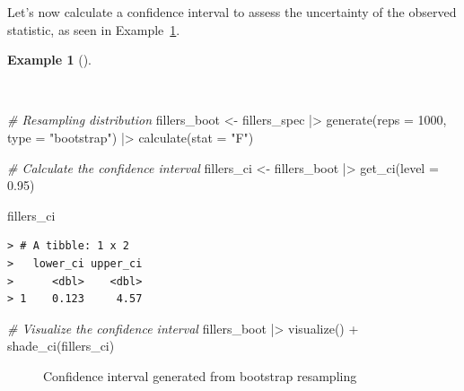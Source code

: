\documentclass[
  letterpaper,
  DIV=11,
  numbers=noendperiod]{scrreprt}
\newenvironment{Shaded}{\begin{snugshade}}{\end{snugshade}}
\newcommand{\AttributeTok}[1]{\textcolor[rgb]{0.00,0.00,0.00}{#1}}
\newcommand{\CommentTok}[1]{\textcolor[rgb]{0.00,0.00,0.00}{\textit{#1}}}
\newcommand{\DecValTok}[1]{\textcolor[rgb]{0.00,0.00,0.00}{#1}}
\newcommand{\FloatTok}[1]{\textcolor[rgb]{0.00,0.00,0.00}{#1}}
\newcommand{\FunctionTok}[1]{\textcolor[rgb]{0.00,0.00,0.00}{#1}}
\newcommand{\NormalTok}[1]{\textcolor[rgb]{0.00,0.00,0.00}{#1}}
\newcommand{\OtherTok}[1]{\textcolor[rgb]{0.00,0.00,0.00}{#1}}
\newcommand{\SpecialCharTok}[1]{\textcolor[rgb]{0.00,0.00,0.00}{#1}}
\newcommand{\StringTok}[1]{\textcolor[rgb]{0.00,0.00,0.00}{#1}}
\theoremstyle{definition}
\newtheorem{example}{Example}[chapter]
\theoremstyle{remark}
\begin{document}
Let's now calculate a confidence interval to assess the uncertainty of
the observed statistic, as seen in Example~\ref{exm-ida-num-bi-edu-ci}.

\begin{example}[]\protect\hypertarget{exm-ida-num-bi-edu-ci}{}\label{exm-ida-num-bi-edu-ci}

~

\begin{Shaded}
\begin{Highlighting}[]
\CommentTok{\# Resampling distribution}
\NormalTok{fillers\_boot }\OtherTok{\textless{}{-}}
\NormalTok{  fillers\_spec }\SpecialCharTok{|\textgreater{}}
  \FunctionTok{generate}\NormalTok{(}\AttributeTok{reps =} \DecValTok{1000}\NormalTok{, }\AttributeTok{type =} \StringTok{"bootstrap"}\NormalTok{) }\SpecialCharTok{|\textgreater{}}
  \FunctionTok{calculate}\NormalTok{(}\AttributeTok{stat =} \StringTok{"F"}\NormalTok{)}

\CommentTok{\# Calculate the confidence interval}
\NormalTok{fillers\_ci }\OtherTok{\textless{}{-}}
\NormalTok{  fillers\_boot }\SpecialCharTok{|\textgreater{}}
  \FunctionTok{get\_ci}\NormalTok{(}\AttributeTok{level =} \FloatTok{0.95}\NormalTok{)}

\NormalTok{fillers\_ci}
\end{Highlighting}
\end{Shaded}

\begin{verbatim}
> # A tibble: 1 x 2
>   lower_ci upper_ci
>      <dbl>    <dbl>
> 1    0.123     4.57
\end{verbatim}

\begin{Shaded}
\begin{Highlighting}[]
\CommentTok{\# Visualize the confidence interval}
\NormalTok{fillers\_boot }\SpecialCharTok{|\textgreater{}}
  \FunctionTok{visualize}\NormalTok{() }\SpecialCharTok{+}
  \FunctionTok{shade\_ci}\NormalTok{(fillers\_ci)}
\end{Highlighting}
\end{Shaded}

\begin{figure}[H]


\caption{\label{fig-ida-num-bi-edu-ci}Confidence interval generated from
bootstrap resampling}

\end{figure}%

\end{example}
\end{document}
